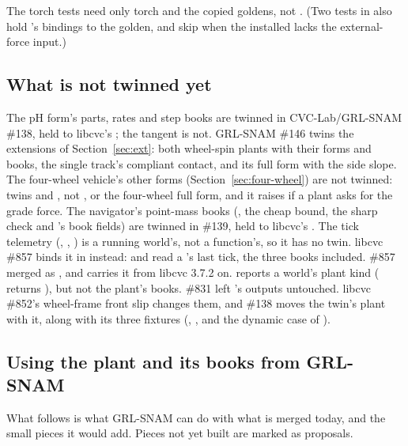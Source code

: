 \documentclass[11pt]{article}
\theoremstyle{remark}
\begin{document}
The torch tests need only torch and the copied goldens, not . (Two tests in
 also hold 's bindings to the golden, and skip when the
installed  lacks the external-force input.)

\subsection{What is not twinned yet}
The pH form's parts, rates and step books are twinned in CVC-Lab/GRL-SNAM \#138, held to libcvc's
; the tangent  is not. GRL-SNAM \#146 twins the
extensions of Section~\ref{sec:ext}: both wheel-spin plants with their forms and books, the single
track's compliant contact, and its full form with the side slope. The four-wheel vehicle's other
forms (Section~\ref{sec:four-wheel}) are not twinned:  twins 
and , not ,  or the four-wheel full
form, and it raises if a plant asks for the grade force. The navigator's point-mass
books (, the cheap bound, the sharp check and 's book fields)
are twinned in \#139, held to libcvc's . The tick telemetry
(, , ) is a running world's, not a
function's, so it has no twin. libcvc \#857 binds it in  instead:
 and  read
a 's last tick, the three books included. \#857 merged as , and
 carries it from libcvc 3.7.2 on.  reports a world's plant kind ( returns
), but not the plant's books. \#831 left 's outputs untouched.
libcvc \#852's wheel-frame front slip changes them, and \#138 moves the twin's plant with it,
along with its three fixtures (, , and
the dynamic case of ).

\subsection{Using the plant and its books from GRL-SNAM}
What follows is what GRL-SNAM can do with what is merged today, and the small pieces it would add.
Pieces not yet built are marked as proposals.
\end{document}
